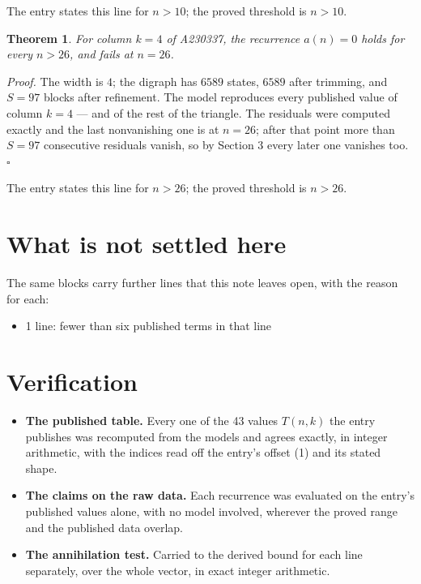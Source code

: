 \documentclass[11pt]{article}
\newtheorem{theorem}{Theorem}
\theoremstyle{definition}
\begin{document}
The entry states this line for $n > 10$; the proved threshold is $n > 10$.

\begin{theorem} For column $k = 4$ of A230337, the recurrence $a(n) = 0$ holds for every $n > 26$, and fails at $n = 26$.\end{theorem}

{\itshape Proof.} The width is $4$; the digraph has $6589$ states, $6589$ after trimming, and $S = 97$ blocks after refinement. The model reproduces every published value of column $k = 4$ --- and of the rest of the triangle. The residuals were computed exactly and the last nonvanishing one is at $n = 26$; after that point more than $S = 97$ consecutive residuals vanish, so by Section 3 every later one vanishes too. $\square$

The entry states this line for $n > 26$; the proved threshold is $n > 26$.

\section{What is not settled here}

The same blocks carry further lines that this note leaves open, with the reason for each:

\begin{itemize}

\item 1 line: fewer than six published terms in that line

\end{itemize}

\section{Verification}

\begin{itemize}

\item {\bfseries The published table.} Every one of the 43 values $T(n,k)$ the entry publishes was recomputed from the models and agrees exactly, in integer arithmetic, with the indices read off the entry's offset (1) and its stated shape.

\item {\bfseries The claims on the raw data.} Each recurrence was evaluated on the entry's published values alone, with no model involved, wherever the proved range and the published data overlap.

\item {\bfseries The annihilation test.} Carried to the derived bound for each line separately, over the whole vector, in exact integer arithmetic.

\end{itemize}
\end{document}
